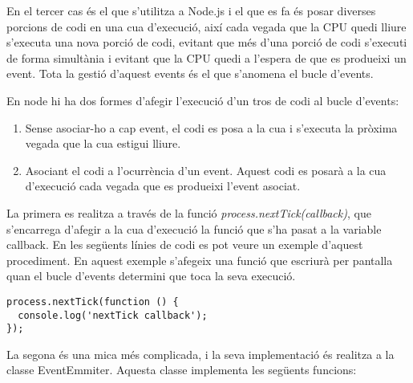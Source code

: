 En el tercer cas és el que s'utilitza a Node.js i el que es fa és posar diverses porcions de codi en una cua d'execució, així cada vegada que la CPU quedi lliure s'executa una nova porció de codi, evitant que més d'una porció de codi s'executi de forma simultània i evitant que la CPU quedi a l'espera de que es produeixi un event.  Tota la gestió d'aquest events és el que s'anomena el bucle d'events. 

En node hi ha dos formes d'afegir l'execució d'un tros de codi al bucle d'events: 

\begin{enumerate}
    \item{Sense asociar-ho a cap event, el codi es posa a la cua i s'executa la pròxima vegada que la cua estigui lliure.}
    \item{Asociant el codi a l'ocurrència d'un event. Aquest codi es posarà a la cua d'execució cada vegada que es produeixi l'event asociat.}
\end{enumerate}

La primera es realitza a través de la funció \emph{process.nextTick(callback)}, que s'encarrega d'afegir a la cua d'execució la funció que s'ha pasat a la variable callback. En les següents línies de codi es pot veure un exemple d'aquest procediment. En aquest exemple s'afegeix una funció que escriurà per pantalla quan el bucle d'events determini que toca la seva execució.

\begin{lstlisting}
process.nextTick(function () {
  console.log('nextTick callback');
});
\end{lstlisting}

La segona és una mica més complicada, i la seva implementació és realitza a la classe EventEmmiter. Aquesta classe implementa les següents funcions: 

